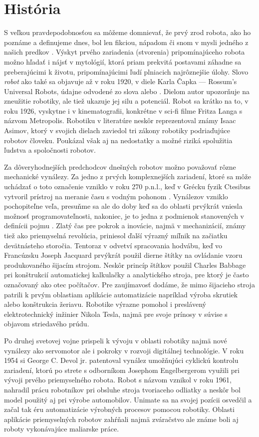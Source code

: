 \section{História}
S veľkou pravdepodobnosťou sa môžeme domnievať, že prvý zrod robota, ako ho poznáme a definujeme dnes, bol len fikciou, nápadom či snom v mysli jedného z našich predkov \cite{RoboticsAndAutomationHandbook}. Výskyt prvého zariadenia (stvorenia) pripomínajúceho robota možno hľadať i nájsť v mytológií, ktorá priam prekvitá postavami záhadne sa preberajúcimi k životu, pripomínajúcimi ľudí plniacich najrôznejšie úlohy. Slovo \textit{robot} ako také sa objavuje až v roku 1920, v diele Karla Čapka --- Rossum's Universal Robots, údajne odvodené zo slova  alebo . Dielom autor upozorňuje na zneužitie robotiky, ale tiež ukazuje jej silu a potenciál. Robot sa krátko na to, v roku 1926, vyskytne i v kinematografii, konkrétne v sci-fi filme Fritza Langa s názvom Metropolis. Robotiku v literatúre neskôr reprezentoval známy Isaac Asimov, ktorý v svojich dielach zaviedol tri zákony robotiky podriaďujúce robotov človeku. Poukázal však aj na nedostatky a možné riziká spolužitia ľudstva a spoločnosti robotov.

Za dôveryhodnejších predchodcov dnešných robotov možno považovať rôzne mechanické vynálezy. Za jedno z prvých komplexnejších zariadení, ktoré sa môže uchádzať o toto označenie vzniklo v roku 270 p.n.l., keď v Grécku fyzik Ctesibus vytvoril prístroj na meranie času s vodným pohonom \cite{RoboticsAndAutomationHandbook}. Vynálezov vzniklo pochopiteľne veľa, presuňme sa ale do doby keď sa do oblasti prvýkrát vniesla možnosť programovateľnosti, nakoniec, je to jedna z podmienok stanovených v definícii pojmu  \cite{ISORobot}. Zlatý čas pre pokrok a inovácie, najmä v mechanizácií, známy tiež ako priemyselná revolúcia, priniesol ďalší výrazný míľnik na začiatku devätnásteho storočia. Tentoraz v odvetví spracovania hodvábu, keď vo Francúzsku Joseph Jacquard prvýkrát použil dierne štítky na ovládanie vzoru produkovaného šijacím strojom. Neskôr princíp štítkov použil Charles Babbage pri konštrukcií automatickej kalkulačky a analytického stroja, pre ktorý je často označovaný ako otec počítačov. Pre zaujímavosť dodáme, že mimo šijacieho stroja patrili k prvým oblastiam aplikácie automatizácie napríklad výroba skrutiek alebo konštrukcia žeriavu. Robotike výrazne pomohol i preslávený elektrotechnický inžinier Nikola Tesla, najmä pre svoje prínosy v súvise s objavom striedavého prúdu.

Po druhej svetovej vojne prispeli k vývoju v oblasti robotiky najmä nové vynálezy ako servomotor ale i pokroky v rozvoji digitálnej technológie. V roku 1954 si George C. Devol jr. patentoval vynález umožňujúci cyklickú kontrolu zariadení, ktorú po strete s odborníkom Josephom Engelbergerom využili pri vývoji prvého priemyselného robota. Robot s názvom  vznikol v roku 1961, nahradil prácu robotníkov pri obsluhe stroja tvoriaceho odliatky a neskôr bol model použitý aj pri výrobe automobilov. Unimate sa na svojej pozícii osvedčil a začal tak éru automatizácie výrobných procesov pomocou robotiky. Oblasti aplikácie priemyselných robotov zahŕňali najmä zváračstvo ale známe boli aj roboty vykonávajúce maliarske práce.

